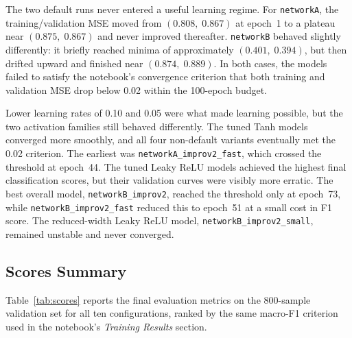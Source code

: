 \documentclass{acm_proc_article-sp}
\begin{document}
The two default runs never entered a useful learning regime.  For
\texttt{networkA}, the training/validation MSE moved from
$(0.808,\;0.867)$ at epoch~1 to a plateau near $(0.875,\;0.867)$ and
never improved thereafter.  \texttt{networkB} behaved slightly
differently: it briefly reached minima of approximately
$(0.401,\;0.394)$, but then drifted upward and finished near
$(0.874,\;0.889)$.  In both cases, the models failed to satisfy the
notebook's convergence criterion that both training and validation MSE
drop below 0.02 within the 100-epoch budget.

Lower learning rates of 0.10 and 0.05 were what made learning possible,
but the two activation families still behaved differently. The tuned
Tanh models converged more smoothly, and all four non-default variants
eventually met the 0.02 criterion. The earliest was
\texttt{networkA\_improv2\_fast}, which crossed the threshold at
epoch~44. The tuned Leaky ReLU models achieved the highest final
classification scores, but their validation curves were visibly more
erratic. The best overall model, \texttt{networkB\_improv2}, reached the
threshold only at epoch~73, while \texttt{networkB\_improv2\_fast}
reduced this to epoch~51 at a small cost in F1 score. The reduced-width
Leaky ReLU model, \texttt{networkB\_improv2\_small}, remained unstable
and never converged.

\subsection{Scores Summary}

Table~\ref{tab:scores} reports the final evaluation metrics on the
800-sample validation set for all ten configurations, ranked by the same
macro-F1 criterion used in the notebook's \textit{Training Results}
section.
\end{document}
